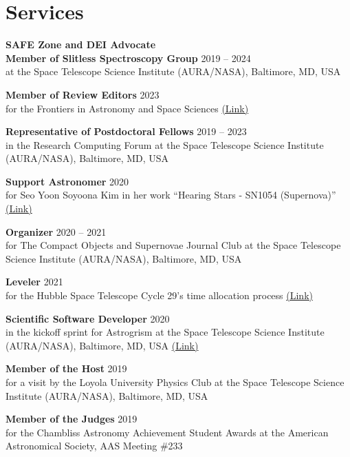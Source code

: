 \documentclass{article}
\begin{document}
\section*{Services}

\textbf{SAFE Zone and DEI Advocate}\\[0.5\baselineskip]

\textbf{Member of Slitless Spectroscopy Group} \hfill 2019 -- 2024\\
at the Space Telescope Science Institute (AURA/NASA), Baltimore, MD, USA

\textbf{Member of Review Editors} \hfill 2023\\
for the Frontiers in Astronomy and Space Sciences \href{https://www.frontiersin.org/journals/astronomy-and-space-sciences}{(Link)}

\textbf{Representative of Postdoctoral Fellows} \hfill 2019 -- 2023\\
in the Research Computing Forum at the Space Telescope Science Institute (AURA/NASA), Baltimore, MD, USA

\textbf{Support Astronomer} \hfill 2020\\
for Seo Yoon Soyoona Kim in her work ``Hearing Stars - SN1054 (Supernova)'' \href{https://www.soyoonakim.com/}{(Link)}

\textbf{Organizer} \hfill 2020 -- 2021\\
for The Compact Objects and Supernovae Journal Club at the Space Telescope Science Institute (AURA/NASA), Baltimore, MD, USA

\textbf{Leveler} \hfill 2021\\
for the Hubble Space Telescope Cycle 29's time allocation process \href{https://www.stsci.edu/contents/newsletters/2021-volume-38-issue-01/addendum-hst-cycle-29-results}{(Link)}

\textbf{Scientific Software Developer} \hfill 2020\\
in the kickoff sprint for Astrogrism at the Space Telescope Science Institute (AURA/NASA), Baltimore, MD, USA \href{https://outerspace.stsci.edu/display/AS}{(Link)} 

\textbf{Member of the Host} \hfill 2019\\
for a visit by the Loyola University Physics Club at the Space Telescope Science Institute (AURA/NASA), Baltimore, MD, USA

\textbf{Member of the Judges} \hfill 2019\\
for the Chambliss Astronomy Achievement Student Awards at the American Astronomical Society, AAS Meeting \#233
\end{document}
